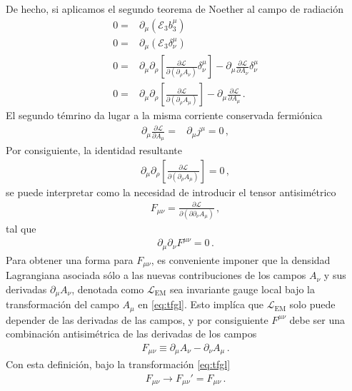 De hecho, si aplicamos el segundo teorema de Noether al campo de radiación
\begin{align}
  0=&\partial_{\mu} \left( \mathcal{E}_3 b^{\mu}_3 \right) \nonumber\\
   0=&\partial_{\mu} \left( \mathcal{E}_3 \delta^{\mu}_\nu \right) \nonumber\\
   0=&
 \partial_{\mu} \partial_{\rho} \left[ \frac{\partial \mathcal{L}}{\partial \left(  \partial_{\rho} A_{\nu}\right)}  \delta^{\mu}_\nu \right] - \partial_{\mu} \frac{\partial \mathcal{L}}{\partial A_{\nu}}\delta^{\mu}_{\nu} \nonumber\\
   0=&
 \partial_{\mu} \partial_{\rho}\left[ \frac{\partial \mathcal{L}}{\partial \left(  \partial_{\rho} A_{\mu}\right)}  \right] - \partial_{\mu} \frac{\partial \mathcal{L}}{\partial A_{\mu}} \,.
\end{align}
El segundo témrino da lugar a la misma corriente conservada fermiónica
\begin{align}
  \partial_{\mu} \frac{\partial \mathcal{L}}{\partial A_{\mu}}=&
\partial_{\mu} j^{\mu}=0\,,
\end{align}
Por consiguiente, la identidad resultante
\begin{align}
   \partial_{\mu} \partial_{\rho}\left[ \frac{\partial \mathcal{L}}{\partial \left(  \partial_{\rho} A_{\mu}\right)}  \right]=0\,,
\end{align}
se puede interpretar como la necesidad de introducir el tensor antisimétrico
\begin{align}
  F_{\mu\nu}=\frac{\partial \mathcal{L}}{\partial \left(\partial  \partial_{\nu} A_{\mu}\right)}\,,
\end{align}
tal que
\begin{align}
  \partial_{\mu}\partial_{\nu}F^{\mu\nu}=0\,.
\end{align}
Para obtener una forma para $F_{\mu\nu}$, es conveniente imponer que la densidad Lagrangiana asociada sólo a las nuevas contribuciones de los campos $A_{\nu}$ y sus derivadas $\partial_{\mu}A_{\nu}$, denotada como $\mathcal{L}_{\text{EM}}$ 
sea invariante gauge local bajo la transformación del campo $A_{\mu}$ en \eqref{eq:tfgl}. Esto implíca que $\mathcal{L}_{\text{EM}}$  solo puede depender de las derivadas de las campos, y por consiguiente $F^{\mu\nu}$ debe ser una combinación antisimétrica de las derivadas de los campos
\begin{align}
  F_{\mu\nu}\equiv\partial_{\mu}A_{\nu}-\partial_{\nu}A_{\mu}\,.
\end{align}
Con esta definición, bajo la transformación  \eqref{eq:tfgl}
\begin{align}
  F_{\mu\nu}\to F_{\mu\nu}'=F_{\mu\nu}\,.
\end{align}

